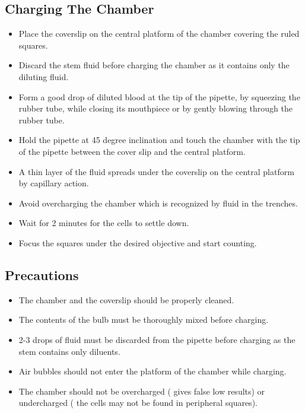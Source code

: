 \documentclass[a4paper,12pt]{book}
\begin{document}
	\subsection*{Charging The Chamber}
	\begin{itemize}

		\item{	 Place the coverslip on the central platform of the chamber covering the ruled squares.}
\item{	 Discard the stem fluid before charging the chamber as it contains only the diluting fluid.}
\item{	 Form a good drop of diluted blood at the tip of the pipette, by squeezing the rubber tube, while closing its mouthpiece or by gently blowing through the rubber tube.}
\item{	 Hold the pipette at 45 degree inclination and touch the chamber with the  tip of the pipette between the cover slip and the central platform.}
\item{	 A thin layer of the fluid spreads under the coverslip on the central  platform by capillary action.}
\item{	 Avoid overcharging the chamber which is recognized by fluid in the  trenches.}
\item{	 Wait for 2 minutes for the cells to settle down.}
\item{	 Focus  the  squares  under  the  desired  objective  and  start  counting.}
	\end{itemize}


	\subsection*{Precautions}
	\begin{itemize}

\item{	 The chamber and the coverslip should be properly cleaned.}
\item{	 The contents of the bulb must be thoroughly mixed before charging.}
\item{	 2-3 drops of fluid must be discarded from the pipette before charging as the stem contains only diluents.}
\item{	 Air bubbles should not enter the platform of the chamber while charging.}
\item{	 The chamber should not be overcharged ( gives false low results) or undercharged ( the cells may not be found in peripheral squares).}
	\end{itemize}
\end{document}
